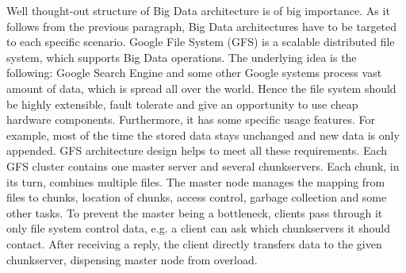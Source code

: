 Well thought-out structure of Big Data architecture is of big importance.
As it follows from the previous paragraph, Big Data architectures have to be targeted to each specific scenario.
%
Google File System (GFS) is a scalable distributed file system, which supports Big Data operations.
The underlying idea is the following: Google Search Engine and some other Google systems process vast amount of data, which is spread all over the world.
Hence the file system should be highly extensible, fault tolerate and give an opportunity to use cheap hardware components.
Furthermore, it has some specific usage features.
For example, most of the time the stored data stays unchanged and new data is only appended.
GFS architecture design helps to meet all these requirements.
Each GFS cluster contains one master server and several chunkservers.
Each chunk, in its turn, combines multiple files.
The master node manages the mapping from files to chunks, location of chunks, access control, garbage collection and some other tasks.
To prevent the master being a bottleneck, clients pass through it only file system control data, e.g. a client can ask which chunkservers it should contact.
After receiving a reply, the client directly transfers data to the given chunkserver, dispensing master node from overload. 
